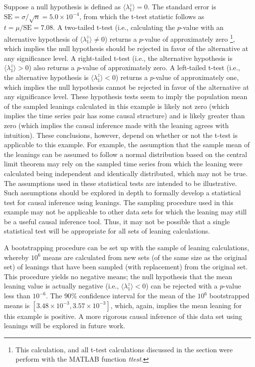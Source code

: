 \documentclass[a4paper,11pt]{article}
\begin{document}
Suppose a null hypothesis is defined as $\langle\lambda_1^z\rangle = 0$.  The standard error is $\mathrm{SE}=\sigma/\sqrt{n}= 5.0\times 10^{-4}$, from which the t-test statistic follows \cite{Casella2002} as $t=\mu/\mathrm{SE}=7.08$.  A two-tailed t-test (i.e., calculating the $p$-value with an alternative hypothesis of $\langle\lambda_1^z\rangle \neq 0$) returns a $p$-value of approximately zero \footnote{This calculation, and all t-test calculations discussed in the section were perform with the {\sc MATLAB} function {\em ttest}.}, which implies the null hypothesis should be rejected in favor of the alternative at any significance level.  A right-tailed t-test (i.e., the alternative hypothesis is $\langle\lambda_1^z\rangle > 0$) also returns a $p$-value of approximately zero.  A left-tailed t-test (i.e., the alternative hypothesis is $\langle\lambda_1^z\rangle < 0$) returns a $p$-value of approximately one, which implies the null hypothesis cannot be rejected in favor of the alternative at any significance level.  These hypothesis tests seem to imply the population mean of the sampled leanings calculated in this example is likely not zero (which implies the time series pair has some causal structure) and is likely greater than zero (which implies the causal inference made with the leaning agrees with intuition).  These conclusions, however, depend on whether or not the t-test is applicable to this example.  For example, the assumption that the sample mean of the leanings can be assumed to follow a normal distribution based on the central limit theorem \cite{Casella2002} may rely on the sampled time series from which the leaning were calculated being independent and identically distributed, which may not be true.  The assumptions used in these statistical tests are intended to be illustrative.  Such assumptions should be explored in depth to formally develop a statistical test for causal inference using leanings.  The sampling procedure used in this example may not be applicable to other data sets for which the leaning may still be a useful causal inference tool.  Thus, it may not be possible that a single statistical test will be appropriate for all sets of leaning calculations.    

A bootstrapping \cite{Efron1994} procedure can be set up with the sample of leaning calculations, whereby $10^6$ means are calculated from new sets (of the same size as the original set) of leanings that have been sampled (with replacement) from the original set.  This procedure yields no negative means; the null hypothesis that the mean leaning value is actually negative (i.e., $\langle\lambda_1^z\rangle < 0$) can be rejected with a $p$-value less than $10^{-6}$.  The $90\%$ confidence interval for the mean of the $10^6$ bootstrapped means is $[3.48\times 10^{-3},3.57\times 10^{-3}]$, which, again, implies the mean leaning for this example is positive.  A more rigorous causal inference of this data set using leanings will be explored in future work.   
\end{document}
